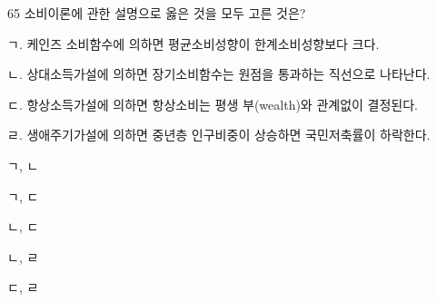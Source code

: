 \begin{question}{65}
소비이론에 관한 설명으로 옳은 것을 모두 고른 것은?
\begin{framedtext}
ㄱ. 케인즈 소비함수에 의하면 평균소비성향이 한계소비성향보다 크다. \par
ㄴ. 상대소득가설에 의하면 장기소비함수는 원점을 통과하는 직선으로 나타난다. \par
ㄷ. 항상소득가설에 의하면 항상소비는 평생 부(wealth)와 관계없이 결정된다. \par
ㄹ. 생애주기가설에 의하면 중년층 인구비중이 상승하면 국민저축률이 하락한다. \par
\end{framedtext}
\begin{choices}
  \item ㄱ, ㄴ
  \item ㄱ, ㄷ
  \item ㄴ, ㄷ
  \item ㄴ, ㄹ
  \item ㄷ, ㄹ
\end{choices}
\end{question}
